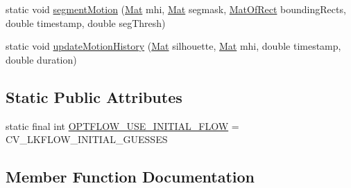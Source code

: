 \begin{DoxyCompactItemize}
static void \mbox{\hyperlink{classorg_1_1opencv_1_1video_1_1_video_a60660bfd1343bdaf7e2336ae884ddbb1}{segment\+Motion}} (\mbox{\hyperlink{classorg_1_1opencv_1_1core_1_1_mat}{Mat}} mhi, \mbox{\hyperlink{classorg_1_1opencv_1_1core_1_1_mat}{Mat}} segmask, \mbox{\hyperlink{classorg_1_1opencv_1_1core_1_1_mat_of_rect}{Mat\+Of\+Rect}} bounding\+Rects, double timestamp, double seg\+Thresh)
\item 
static void \mbox{\hyperlink{classorg_1_1opencv_1_1video_1_1_video_a8015dfe15987374863ba664441b88c36}{update\+Motion\+History}} (\mbox{\hyperlink{classorg_1_1opencv_1_1core_1_1_mat}{Mat}} silhouette, \mbox{\hyperlink{classorg_1_1opencv_1_1core_1_1_mat}{Mat}} mhi, double timestamp, double duration)
\end{DoxyCompactItemize}
\subsection*{Static Public Attributes}
\begin{DoxyCompactItemize}
\item 
static final int \mbox{\hyperlink{classorg_1_1opencv_1_1video_1_1_video_a85d678f02873f6767ade353c697d06ae}{O\+P\+T\+F\+L\+O\+W\+\_\+\+U\+S\+E\+\_\+\+I\+N\+I\+T\+I\+A\+L\+\_\+\+F\+L\+OW}} = C\+V\+\_\+\+L\+K\+F\+L\+O\+W\+\_\+\+I\+N\+I\+T\+I\+A\+L\+\_\+\+G\+U\+E\+S\+S\+ES
\end{DoxyCompactItemize}


\subsection{Member Function Documentation}
\mbox{\label{classorg_1_1opencv_1_1video_1_1_video_a84281eba959eb6d424d94aca84ae738f}} 
